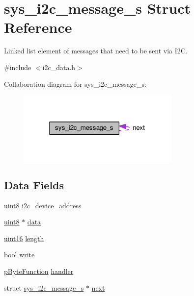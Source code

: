 \hypertarget{structsys__i2c__message__s}{}\section{sys\+\_\+i2c\+\_\+message\+\_\+s Struct Reference}
\label{structsys__i2c__message__s}


Linked list element of messages that need to be sent via I2\+C.  




{\ttfamily \#include $<$i2c\+\_\+data.\+h$>$}



Collaboration diagram for sys\+\_\+i2c\+\_\+message\+\_\+s\+:\nopagebreak
\begin{figure}[H]
\begin{center}
\leavevmode
\includegraphics[width=226pt]{da/d56/structsys__i2c__message__s__coll__graph}
\end{center}
\end{figure}
\subsection*{Data Fields}
\begin{DoxyCompactItemize}
\item 
\hyperlink{definitions_8h_adde6aaee8457bee49c2a92621fe22b79}{uint8} \hyperlink{structsys__i2c__message__s_ad5b59be1fb573e7bc9b9b89da842c4aa}{i2c\+\_\+device\+\_\+address}
\item 
\hyperlink{definitions_8h_adde6aaee8457bee49c2a92621fe22b79}{uint8} $\ast$ \hyperlink{structsys__i2c__message__s_a49fa3d575b300fed2ea06cf331fa2180}{data}
\item 
\hyperlink{definitions_8h_a05f6b0ae8f6a6e135b0e290c25fe0e4e}{uint16} \hyperlink{structsys__i2c__message__s_a1846dd3ca2c59e4a1e68f2edb0c4b191}{length}
\item 
bool \hyperlink{structsys__i2c__message__s_ac3e159ca5b6afac6458dd2b7c991ce4f}{write}
\item 
\hyperlink{definitions_8h_a82fa7f76266ee1d687b76a44445f21ef}{p\+Byte\+Function} \hyperlink{structsys__i2c__message__s_a8632203d9a89893cb761ec37356c2288}{handler}
\item 
struct \hyperlink{structsys__i2c__message__s}{sys\+\_\+i2c\+\_\+message\+\_\+s} $\ast$ \hyperlink{structsys__i2c__message__s_aa435a9b8a1c7fabb600fd1394931a9a8}{next}
\end{DoxyCompactItemize}



